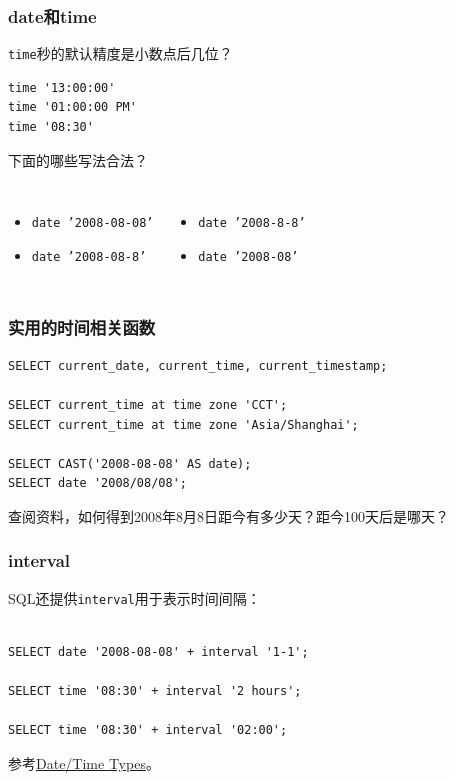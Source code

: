 \documentclass[aspectratio=169, 14pt]{beamer}
\begin{document}
\begin{frame}[fragile]
    \frametitle{date和time}

 \texttt{time}秒的默认精度是小数点后几位？
\begin{verbatim}
time '13:00:00'
time '01:00:00 PM'
time '08:30'
\end{verbatim}

\pause
{} 下面的哪些写法合法？
\begin{columns}
    \begin{itemize}
        \item \texttt{date '2008-08-08'}
        \item \texttt{date '2008-08-8'}
    \end{itemize}
    \begin{itemize}
        \item \texttt{date '2008-8-8'}
        \item \texttt{date '2008-08'}
    \end{itemize}
\end{columns}

\end{frame}

\begin{frame}[fragile]
    \frametitle{实用的时间相关函数}

    \begin{verbatim}
SELECT current_date, current_time, current_timestamp;

SELECT current_time at time zone 'CCT';
SELECT current_time at time zone 'Asia/Shanghai';

SELECT CAST('2008-08-08' AS date);
SELECT date '2008/08/08';
    \end{verbatim}

 查阅资料，如何得到2008年8月8日距今有多少天？距今100天后是哪天？

\end{frame}

\begin{frame}[fragile]
    \frametitle{interval}
SQL还提供\alert{\texttt{interval}}用于表示时间间隔：

\begin{verbatim}

SELECT date '2008-08-08' + interval '1-1';

SELECT time '08:30' + interval '2 hours';

SELECT time '08:30' + interval '02:00';
    \end{verbatim}

参考\href{https://www.postgresql.org/docs/14/datatype-datetime.html}{Date/Time Types}。

\end{frame}
\end{document}
